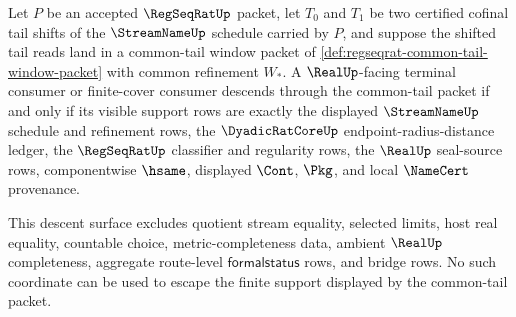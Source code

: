 \begin{theorem}
\label{thm:regseqrat-common-tail-support-descent-nonescape}
Let $P$ be an accepted $\RegSeqRatUp$ packet, let $T_0$ and $T_1$ be two certified cofinal tail shifts of the $\StreamNameUp$ schedule carried by $P$, and suppose the shifted tail reads land in a common-tail window packet of \autoref{def:regseqrat-common-tail-window-packet} with common refinement $W_\ast$. A $\RealUp$-facing terminal consumer or finite-cover consumer descends through the common-tail packet if and only if its visible support rows are exactly the displayed $\StreamNameUp$ schedule and refinement rows, the $\DyadicRatCoreUp$ endpoint-radius-distance ledger, the $\RegSeqRatUp$ classifier and regularity rows, the $\RealUp$ seal-source rows, componentwise $\hsame$, displayed $\Cont$, $\Pkg$, and local $\NameCert$ provenance.

This descent surface excludes quotient stream equality, selected limits, host real equality, countable choice, metric-completeness data, ambient $\RealUp$ completeness, aggregate route-level $\mathsf{formalstatus}$ rows, and bridge rows. No such coordinate can be used to escape the finite support displayed by the common-tail packet.
\end{theorem}
